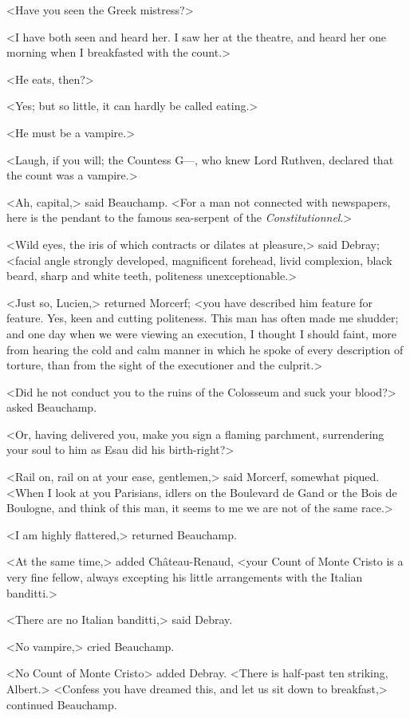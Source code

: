  <Have you seen the Greek mistress?> 

 <I have both seen and heard her. I saw her at the theatre, and heard her one morning when I breakfasted with the count.> 

 <He eats, then?> 

 <Yes; but so little, it can hardly be called eating.> 

 <He must be a vampire.> 

 <Laugh, if you will; the Countess G—, who knew Lord Ruthven, declared that the count was a vampire.> 

 <Ah, capital,> said Beauchamp. <For a man not connected with newspapers, here is the pendant to the famous sea-serpent of the \textit{Constitutionnel}.> 

 <Wild eyes, the iris of which contracts or dilates at pleasure,> said Debray; <facial angle strongly developed, magnificent forehead, livid complexion, black beard, sharp and white teeth, politeness unexceptionable.> 

 <Just so, Lucien,> returned Morcerf; <you have described him feature for feature. Yes, keen and cutting politeness. This man has often made me shudder; and one day when we were viewing an execution, I thought I should faint, more from hearing the cold and calm manner in which he spoke of every description of torture, than from the sight of the executioner and the culprit.> 

 <Did he not conduct you to the ruins of the Colosseum and suck your blood?> asked Beauchamp. 

 <Or, having delivered you, make you sign a flaming parchment, surrendering your soul to him as Esau did his birth-right?> 

 <Rail on, rail on at your ease, gentlemen,> said Morcerf, somewhat piqued. <When I look at you Parisians, idlers on the Boulevard de Gand or the Bois de Boulogne, and think of this man, it seems to me we are not of the same race.> 

 <I am highly flattered,> returned Beauchamp. 

 <At the same time,> added Château-Renaud, <your Count of Monte Cristo is a very fine fellow, always excepting his little arrangements with the Italian banditti.> 

 <There are no Italian banditti,> said Debray. 

 <No vampire,> cried Beauchamp. 

 <No Count of Monte Cristo> added Debray. <There is half-past ten striking, Albert.>  <Confess you have dreamed this, and let us sit down to breakfast,> continued Beauchamp. 

